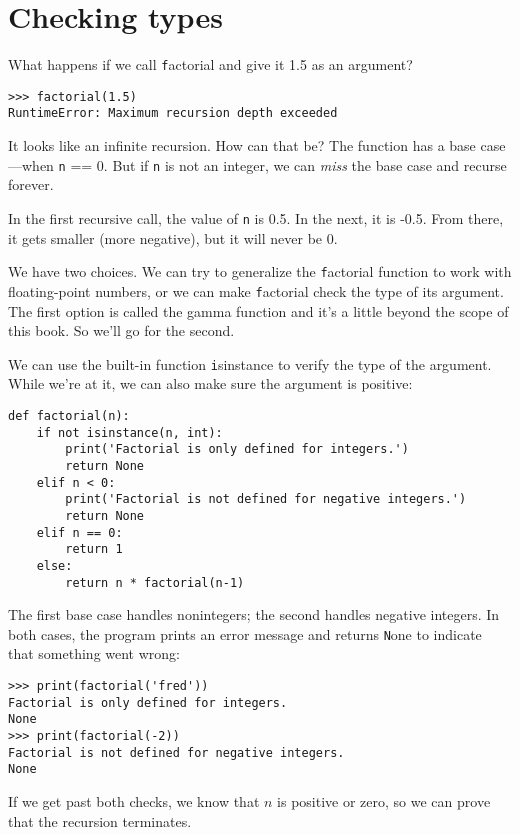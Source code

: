 \documentclass[
DIV=11,
fontsize=13,
twoside,
headinclude=false,
titlepage=firstiscover,
abstract=true,
headsepline=true,
footsepline=true,
chapterprefix=true, %
headings=big,
bibliography=totoc,%
captions=tableheading
]{scrbook}
\theoremstyle{definition}
\begin{document}
\section{Checking types}
\label{guardian}

What happens if we call {\texttt factorial} and give it 1.5 as an argument?

\begin{lstlisting}
>>> factorial(1.5)
RuntimeError: Maximum recursion depth exceeded
\end{lstlisting}
%
It looks like an infinite recursion.  How can that be?  The function
has a base case---when {\texttt n == 0}.  But if {\texttt n} is not an integer,
we can {\em miss} the base case and recurse forever.

In the first recursive call, the value of {\texttt n} is 0.5.
In the next, it is -0.5.  From there, it gets smaller
(more negative), but it will never be 0.

We have two choices.  We can try to generalize the {\texttt factorial}
function to work with floating-point numbers, or we can make {\texttt
  factorial} check the type of its argument.  The first option is
called the gamma function and it's a
little beyond the scope of this book.  So we'll go for the second.

We can use the built-in function {\texttt isinstance} to verify the type
of the argument.  While we're at it, we can also make sure the
argument is positive:

\begin{lstlisting}
def factorial(n):
    if not isinstance(n, int):
        print('Factorial is only defined for integers.')
        return None
    elif n < 0:
        print('Factorial is not defined for negative integers.')
        return None
    elif n == 0:
        return 1
    else:
        return n * factorial(n-1)
\end{lstlisting}
%
The first base case handles nonintegers; the
second handles negative integers.  In both cases, the program prints
an error message and returns {\texttt None} to indicate that something
went wrong:

\begin{lstlisting}
>>> print(factorial('fred'))
Factorial is only defined for integers.
None
>>> print(factorial(-2))
Factorial is not defined for negative integers.
None
\end{lstlisting}
% 
If we get past both checks, we know that $n$ is positive or
zero, so we can prove that the recursion terminates.
\end{document}
